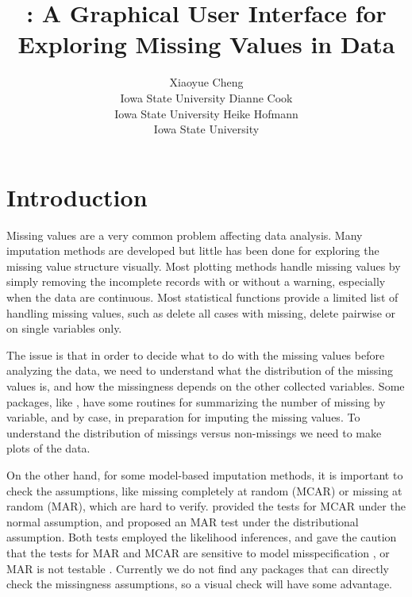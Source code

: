 \documentclass[article]{jss}
\author{Xiaoyue Cheng\\Iowa State University \And 
        Dianne Cook\\Iowa State University \And
        Heike Hofmann\\Iowa State University}
\title{\pkg{MissingDataGUI}: A Graphical User Interface for Exploring 
	Missing Values in Data}
\begin{document}
\section{Introduction}

Missing values are a very common problem affecting data analysis. Many imputation methods are developed but little has been done for exploring the missing value structure visually.  Most plotting methods handle missing values by simply removing the incomplete records with or without a warning, especially when the data are continuous. Most statistical functions provide a limited list of handling missing values, such as delete all cases with missing, delete pairwise or on single variables only.

The issue is that in order to decide what to do with the missing values before analyzing the data, we need to understand what the distribution of the missing values is, and how the missingness depends on the other collected variables. Some  packages, like  \citep{hmisc}, have some routines for summarizing the number of missing by variable, and by case, in preparation for imputing the missing values. To understand the distribution of missings versus non-missings we need to make plots of the data.

On the other hand, for some model-based imputation methods, it is important to check the assumptions, like missing completely at random (MCAR) or missing at random (MAR), which are hard to verify. \citet{little1988test} provided the tests for MCAR under the normal assumption, and \citet{jaeger2006testing} proposed an MAR test under the distributional assumption. Both tests employed the likelihood inferences, and gave the caution that the tests for MAR and MCAR are sensitive to model misspecification \citep{little1988test}, or MAR is not testable \citep{jaeger2006testing}. Currently we do not find any  packages that can directly check the missingness assumptions, so a visual check will have some advantage.
\end{document}
